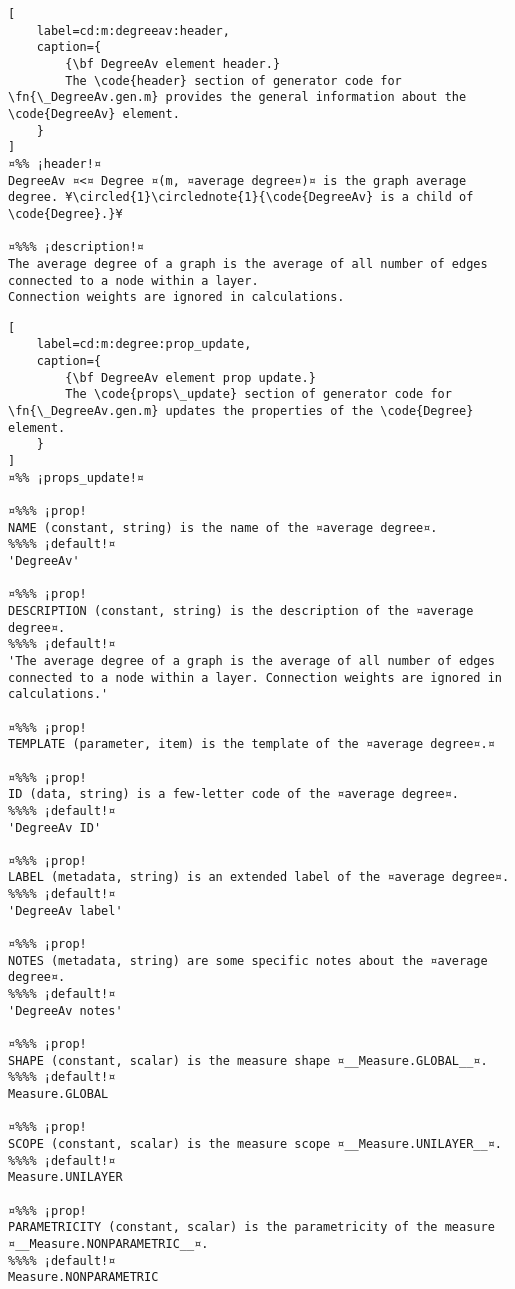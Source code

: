\documentclass{tufte-handout}
\begin{document}
\begin{lstlisting}[
	label=cd:m:degreeav:header,
	caption={
		{\bf DegreeAv element header.}
		The \code{header} section of generator code for \fn{\_DegreeAv.gen.m} provides the general information about the \code{DegreeAv} element.
	}
]
¤%% ¡header!¤
DegreeAv ¤<¤ Degree ¤(m, ¤average degree¤)¤ is the graph average degree. ¥\circled{1}\circlednote{1}{\code{DegreeAv} is a child of \code{Degree}.}¥

¤%%% ¡description!¤
The average degree of a graph is the average of all number of edges connected to a node within a layer. 
Connection weights are ignored in calculations.
\end{lstlisting}

\begin{lstlisting}[
	label=cd:m:degree:prop_update,
	caption={
		{\bf DegreeAv element prop update.}
		The \code{props\_update} section of generator code for \fn{\_DegreeAv.gen.m} updates the properties of the \code{Degree} element.
	}
]
¤%% ¡props_update!¤

¤%%% ¡prop!
NAME (constant, string) is the name of the ¤average degree¤.
%%%% ¡default!¤
'DegreeAv'

¤%%% ¡prop!
DESCRIPTION (constant, string) is the description of the ¤average degree¤.
%%%% ¡default!¤
'The average degree of a graph is the average of all number of edges connected to a node within a layer. Connection weights are ignored in calculations.'

¤%%% ¡prop!
TEMPLATE (parameter, item) is the template of the ¤average degree¤.¤

¤%%% ¡prop!
ID (data, string) is a few-letter code of the ¤average degree¤.
%%%% ¡default!¤
'DegreeAv ID'

¤%%% ¡prop!
LABEL (metadata, string) is an extended label of the ¤average degree¤.
%%%% ¡default!¤
'DegreeAv label'

¤%%% ¡prop!
NOTES (metadata, string) are some specific notes about the ¤average degree¤.
%%%% ¡default!¤
'DegreeAv notes'

¤%%% ¡prop!
SHAPE (constant, scalar) is the measure shape ¤__Measure.GLOBAL__¤.
%%%% ¡default!¤
Measure.GLOBAL

¤%%% ¡prop!
SCOPE (constant, scalar) is the measure scope ¤__Measure.UNILAYER__¤.
%%%% ¡default!¤
Measure.UNILAYER

¤%%% ¡prop!
PARAMETRICITY (constant, scalar) is the parametricity of the measure ¤__Measure.NONPARAMETRIC__¤.
%%%% ¡default!¤
Measure.NONPARAMETRIC


\end{lstlisting}
\end{document}

